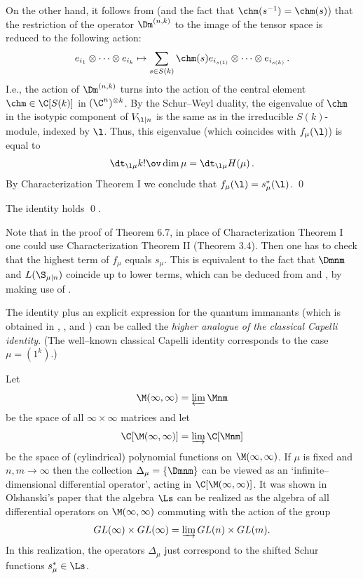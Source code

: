 On the other hand, it follows from  (and the fact that
$\chm(s^{-1})=\chm(s)$) that the restriction of the operator $\Dm^{(n,k)}$ to the
image of the tensor space is reduced to the following action:
$$
e_{i_1}\otimes\dots\otimes e_{i_k} \mapsto
\sum_{s\in S(k)} \chm(s) 
e_{i_{s(1)}}\otimes\dots\otimes e_{i_{s(k)}} \,.
$$
I.e., the action of $\Dm^{(n,k)}$ turns into the action of 
the central element $\chm\in\C[S(k)]$ in $(\C^n)^{\otimes k}$. By the
Schur--Weyl duality, the eigenvalue of $\chm$ in the isotypic component of
$V_{\l|n}$ is the same as in the irreducible $S(k)$-module, indexed by
$\l$. Thus, this eigenvalue (which coincides with $f_\mu(\l)$) is equal to
$$
\dt_{\l\mu} k!\ov \dim\mu = \dt_{\l\mu} H(\mu) \,.
$$
By Characterization Theorem I we conclude that $f_\mu(\l)=s_\mu^*(\l)$.
\qed 
\enddemo  

 The identity  holds \qed.
\endproclaim

Note that in the proof of Theorem 6.7, in place of Characterization
Theorem I one could use 
Characterization Theorem II (Theorem 3.4). Then one has to check that the
highest term of $f_\mu$ equals $s_\mu$. This is equivalent to the fact that 
$\Dmnm$ and $L(\S_{\mu|n})$ coincide up to lower terms, which can be
deduced from  and , by making use of .


The identity  plus an explicit expression for the quantum immanants
(which is obtained in \cite{Ok1}, \cite{N2}, and \cite{Ok2}) can be called 
the {\it higher analogue of the classical Capelli 
identity\/}. (The well--known classical Capelli identity corresponds
to the case $\mu=(1^k)$.)

 Let 
$$
\M(\infty,\infty)=\varprojlim\Mnm
$$
be the space of all $\infty\times\infty$ matrices and let
$$
\C[\M(\infty,\infty)]=\varinjlim \C[\Mnm]
$$
be the space of (cylindrical) polynomial functions on $\M(\infty,\infty)$.
If $\mu$ is fixed and $n,m\to\infty$ then the collection
$\Delta_\mu=\{\Dmnm\}$ can be viewed as an `infinite--dimensional
differential operator', acting in $\C[\M(\infty,\infty)]$. It was shown in
Olshanski's paper \cite{O2} that the algebra $\Ls$ can be realized as
the algebra of all differential operators on $\M(\infty,\infty)$ commuting
with the action of the group 
$$
GL(\infty)\times GL(\infty)=\varinjlim GL(n)\times GL(m).
$$
In this realization, the operators $\Delta_\mu$ just correspond to the
shifted Schur functions $s^*_\mu\in\Ls$.
\endexample


